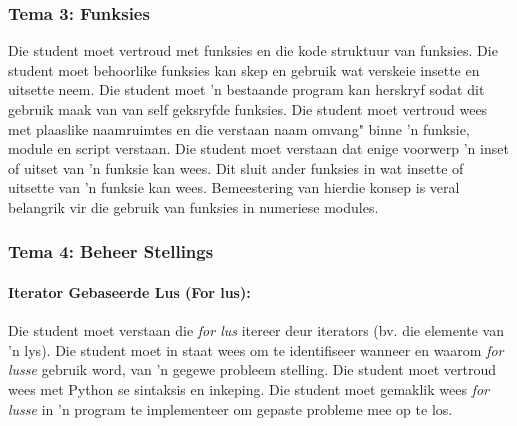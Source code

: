         \subsubsection{Tema 3: Funksies}
            Die student moet vertroud met funksies en die kode struktuur van
            funksies.  Die student moet behoorlike funksies kan skep en gebruik
            wat verskeie insette en uitsette neem. Die student moet  'n
            bestaande program kan herskryf sodat dit gebruik maak van van self
            geksryfde funksies.  Die student moet vertroud wees met plaaslike
            naamruimtes en die verstaan naam omvang" binne 'n funksie, module
            en script verstaan. Die student moet verstaan dat enige voorwerp 'n
            inset of uitset van 'n funksie kan wees. Dit sluit ander funksies
            in wat insette of uitsette van 'n funksie kan wees. Bemeestering
            van hierdie konsep is veral belangrik vir die gebruik van funksies
            in numeriese modules.

        \subsubsection{Tema 4: Beheer Stellings}
            \paragraph{Iterator Gebaseerde Lus (For lus):}
                Die student moet verstaan die \textit{for lus} itereer deur
                iterators (bv. die elemente van 'n lys). Die student moet in
                staat wees om te identifiseer wanneer en waarom \textit{for
                lusse} gebruik  word, van 'n gegewe probleem stelling. Die
                student moet vertroud wees met Python se sintaksis en inkeping.
                Die student moet gemaklik wees \textit{for lusse} in 'n
                program te implementeer om gepaste probleme mee op te los.

